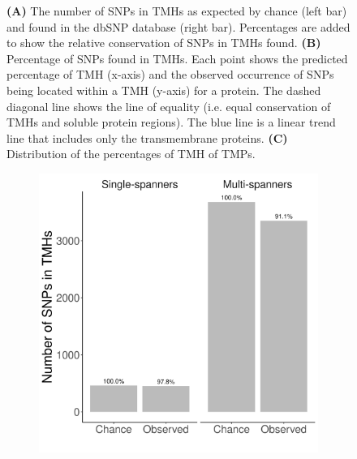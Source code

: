\begin{figure}
  \caption{
    \textbf{(A)} 
    The number of SNPs in TMHs as expected by chance (left bar) 
    and found in the dbSNP database (right bar).
    Percentages are added to show the relative conservation
    of SNPs in TMHs found.
    \textbf{(B)}
    Percentage of SNPs found in TMHs.
    Each point shows the predicted percentage of
    TMH (x-axis) and the observed occurrence of SNPs being located
    within a TMH (y-axis) for a protein.
    The dashed diagonal line shows the line of equality (i.e.
    equal conservation of TMHs and soluble protein regions).
    The blue line is a linear trend line that includes only the
    transmembrane proteins.
    \textbf{(C)}
    Distribution of the percentages of TMH of TMPs.
  }
\end{figure}

\begin{figure}
  \centering
  \begin{subfigure}[t]{0.45\textwidth}
    \centering
    \caption{}
    \includegraphics[width=\linewidth]{ncbi_peregrine_results/fig_conservation_per_spanner.png}
    \label{fig:conservation_per_spanner}
  \end{subfigure}
  \hfill
  \begin{subfigure}[t]{0.45\textwidth}
    \centering
    \caption{}

\end{subfigure}
\end{figure}
